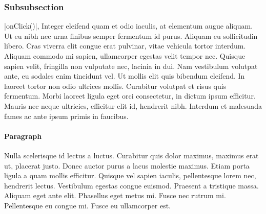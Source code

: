 \documentclass[10pt,sigconf,anonymous]{acmart}
\begin{document}
\subsubsection{Subsubsection}

\ls|onClick()|, Integer eleifend quam et odio iaculis, at elementum augue aliquam.
Ut eu nibh nec urna finibus semper fermentum id purus.
Aliquam eu sollicitudin libero.
Cras viverra elit congue erat pulvinar, vitae vehicula tortor interdum.
Aliquam commodo mi sapien, ullamcorper egestas velit tempor nec.
Quisque sapien velit, fringilla non vulputate nec, lacinia in dui.
Nam vestibulum volutpat ante, eu sodales enim tincidunt vel.
Ut mollis elit quis bibendum eleifend.
In laoreet tortor non odio ultrices mollis.
Curabitur volutpat et risus quis fermentum.
Morbi laoreet ligula eget orci consectetur, in dictum ipsum efficitur.
Mauris nec neque ultricies, efficitur elit id, hendrerit nibh.
Interdum et malesuada fames ac ante ipsum primis in faucibus.



\paragraph{Paragraph}

Nulla scelerisque id lectus a luctus.
Curabitur quis dolor maximus, maximus erat ut, placerat justo.
Donec auctor purus a lacus molestie maximus.
Etiam porta ligula a quam mollis efficitur.
Quisque vel sapien iaculis, pellentesque lorem nec, hendrerit lectus.
Vestibulum egestas congue euismod.
Praesent a tristique massa.
Aliquam eget ante elit.
Phasellus eget metus mi.
Fusce nec rutrum mi.
Pellentesque eu congue mi.
Fusce eu ullamcorper est.
 


 

\balance
\end{document}
